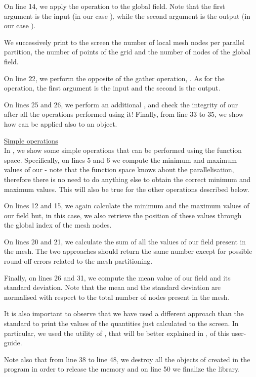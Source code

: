 \begin{description}
On line 14, we apply the  operation to the global field.
Note that the first argument is the input (in our case ),
while the second argument is the output (in our case ).

We successively print to the screen the number of local mesh nodes 
per parallel partition, the number of points of the grid and the 
number of nodes of the global field.

On line 22, we perform the opposite of the gather operation, 
. As for the  operation, the 
first argument is the input and the second is the output.

On lines 25 and 26, we perform an additional , 
and check the integrity of our  after 
all the operations performed using it! 
Finally, from line 33 to 35, we show how  
can be applied also to an  object.

%

%
%
\item \underline{Simple operations}\\[0.5em]
%
In , we show some simple operations that 
can be performed using the  function space. Specifically, 
on lines 5 and 6 we compute the minimum and maximum values of our 
 - note that the function space knows about 
the parallelisation, therefore there is no need to do anything 
else to obtain the correct minimum and maximum values. This will
also be true for the other operations described below.

On lines 12 and 15, we again calculate the minimum and the maximum 
values of our field but, in this case, we also retrieve the position 
of these values through the global index of the mesh nodes.

On lines 20 and 21, we calculate the sum of all the values of our 
field present in the mesh. The two approaches should return the 
same number except for possible round-off errors related to the 
mesh partitioning.

Finally, on lines 26 and 31, we compute the mean value of our
field and its standard deviation. Note that the mean and the 
standard deviation are normalised with respect to the total 
number of nodes present in the mesh.

It is also important to observe that we have used a different 
approach than the standard  to print the values 
of the quantities just calculated to the screen. In particular, 
we used the  utility of \Atlas, that will 
be better explained in , of this user-guide.

Note also that from line 38 to line 48, we destroy all the objects
of created in the program in order to release the memory and on 
line 50 we finalize the \Atlas library.
%

%
\end{description}
